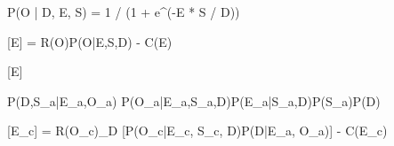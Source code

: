 P(O | D, E, S) = 1 / (1 + e^{(-E * S / D)})

[E] = R(O)P(O|E,S,D) - C(E)

 [E]

P(D,S_a|E_a,O_a) \propto P(O_a|E_a,S_a,D)P(E_a|S_a,D)P(S_a)P(D)

[E_c] = R(O_c)\sum_D [P(O_c|E_c, S_c, D)P(D|E_a, O_a)] - C(E_c)

